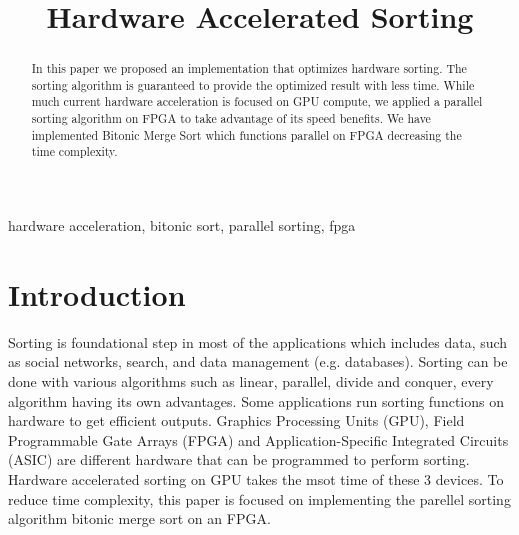 \documentclass[conference]{IEEEtran}
\begin{document}
\title{Hardware Accelerated Sorting\\
}

\author{
\and
{}
\and
{}
}

\maketitle

\begin{abstract}
 In this paper we proposed an implementation that optimizes hardware sorting. The sorting algorithm is guaranteed to provide the optimized result with less time. While much current hardware acceleration is focused on GPU compute, we applied a parallel sorting algorithm on FPGA to take advantage of its speed benefits. We have implemented Bitonic Merge Sort which functions parallel on FPGA decreasing the time complexity.
\end{abstract}

\begin{IEEEkeywords}
hardware acceleration, bitonic sort, parallel sorting, fpga
\end{IEEEkeywords}

\section{Introduction}
Sorting is foundational step in most of the applications which includes data, such as social networks, search, and data management (e.g. databases). Sorting can be done with various algorithms such as linear, parallel, divide and conquer, every algorithm having its own advantages. Some applications run sorting functions on hardware to get efficient outputs. Graphics Processing Units (GPU), Field Programmable Gate Arrays (FPGA) and Application-Specific Integrated Circuits (ASIC) are different hardware that can be programmed to perform sorting. Hardware accelerated sorting on GPU takes the msot time of these 3 devices. To reduce time complexity, this paper is focused on implementing the parellel sorting algorithm bitonic merge sort on an FPGA.
\end{document}
